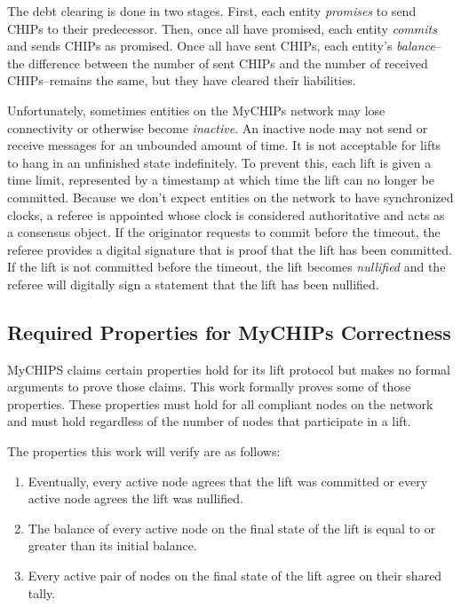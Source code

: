 \documentclass[runningheads]{llncs}
\begin{document}
The debt clearing is done in two stages. First, each entity \emph{promises} to send CHIPs to their predecessor. Then, once all have promised, each entity \emph{commits} and sends CHIPs as promised. Once all have sent CHIPs, each entity's \emph{balance}--the difference between the number of sent CHIPs and the number of received CHIPs--remains the same, but they have cleared their liabilities. 

Unfortunately, sometimes entities on the MyCHIPs network may lose connectivity or otherwise become \emph{inactive}. An inactive node may not send or receive messages for an unbounded amount of time. It is not acceptable for lifts to hang in an unfinished state indefinitely. To prevent this, each lift is given a time limit, represented by a timestamp at which time the lift can no longer be committed. Because we don't expect entities on the network to have synchronized clocks, a referee is appointed whose clock is considered authoritative and acts as a consensus object. If the originator requests to commit before the timeout, the referee provides a digital signature that is proof that the lift has been committed. If the lift is not committed before the timeout, the lift becomes \emph{nullified} and the referee will digitally sign a statement that the lift has been nullified.

\subsection{Required Properties for MyCHIPs Correctness}\label{sec:requiredProperties}

MyCHIPS claims certain properties hold for its lift protocol but makes no formal arguments to prove those claims. This work formally proves some of those properties. These properties must hold for all compliant nodes on the network and must hold regardless of the number of nodes that participate in a lift. 

The properties this work will verify are as follows:

\begin{enumerate}
\item Eventually, every active node agrees that the lift was committed or every active node agrees the lift was nullified. 
\item The balance of every active node on the final state of the lift is equal to or greater than its initial balance.
\item Every active pair of nodes on the final state of the lift agree on their shared tally.
\end{enumerate}
\end{document}
